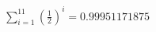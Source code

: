 \documentclass[preview]{standalone}
\begin{document}
\begin{align*}
\sum_{i=1}^{11} \left(\frac{1}{2}\right)^i = {0.99951171875}
\end{align*}
\end{document}
